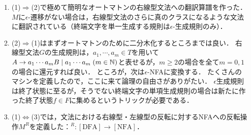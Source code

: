 \documentclass[uplatex, dvipdfmx]{jsreport}
\begin{document}
\begin{remarks}[３つの同型対応]\mbox{}
    \begin{enumerate}
        \item (1)$\Rightarrow$(2)で極めて簡明なオートマトンの右線型文法への翻訳算譜を作った．
        $M$に$\epsilon$-遷移がない場合は，右線型文法のさらに真のクラスになるような文法に翻訳されている（終端文字を単一生成する規則は$\epsilon$-生成規則のみ）．
        \item (2)$\Rightarrow$(1)はまずオートマトンのために二分木化するところまでは良い．
        右線型文法$G$の生成規則は，$a_1,\cdots,a_m\in T$を用いて$A\to a_1\cdots a_mB\mid a_1\cdots a_m\;(m\in\mathbb{N})$と表せるが，$m\ge 2$の場合を全て$m=0,1$の場合に還元すれば良い．
        ところが，次は$\epsilon$-NFAに変換する．
        たくさんのマシンを定義したので，ここに来て論理の自由さがありがたい．
        $\epsilon$生成規則は終了状態に至るが，そうでない終端文字の単項生成規則の場合は新たに作った終了状態$f\in F$に集めるというトリックが必要である．
        \item (1)$\Leftrightarrow$(3)では，文法における右線型・左線型の反転に対するNFAへの反転操作$M^R$を定義した：${}^R:[\mathrm{DFA}]\to[\mathrm{NFA}]$．
    \end{enumerate}
\end{remarks}
\end{document}
